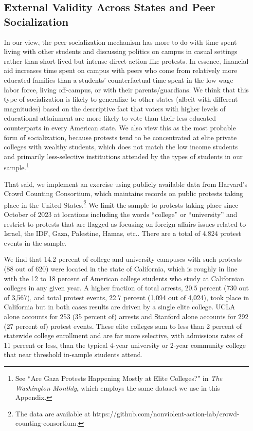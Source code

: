 \documentclass[12pt,letterpaper,oneside]{book}
\begin{document}
\subsection{External Validity Across States and Peer Socialization}\label{sec:externalvalid}
In our view, the peer socialization mechanism has more to do with time spent living with other students and discussing politics on campus in casual settings rather than short-lived but intense direct action like protests. In essence, financial aid increases time spent on campus with peers who come from relatively more educated families than a students' counterfactual time spent in the low-wage labor force, living off-campus, or with their parents/guardians. We think that this type of socialization is likely to generalize to other states (albeit with different magnitudes) based on the descriptive fact that voters with higher levels of educational attainment are more likely to vote than their less educated counterparts in every American state. We also view this as the most probable form of socialization, because protests tend to be concentrated at elite private colleges with wealthy students, which does not match the low income students and primarily less-selective institutions attended by the types of students in our sample.\footnote{See ``Are Gaza Protests Happening Mostly at Elite Colleges?'' in \textit{The Washington Monthly}, which employs the same dataset we use in this Appendix.}

That said, we implement an exercise using publicly available data from Harvard's Crowd Counting Consortium, which maintains records on public protests taking place in the United States.\footnote{The data are available at https://github.com/nonviolent-action-lab/crowd-counting-consortium.} We limit the sample to protests taking place since October of 2023 at locations including the words “college” or “university” and restrict to protests that are flagged as focusing on foreign affairs issues related to Israel, the IDF, Gaza, Palestine, Hamas, etc.. There are a total of 4,824 protest events in the sample.

We find that 14.2 percent of college and university campuses with such protests (88 out of 620) were located in the state of California, which is roughly in line with the 12 to 18 percent of American college students who study at Californian colleges in any given year. A higher fraction of total arrests, 20.5 percent (730 out of 3,567), and total protest events, 22.7 percent (1,094 out of 4,024), took place in California but in both cases results are driven by a single elite college. UCLA alone accounts for 253 (35 percent of) arrests and Stanford alone accounts for 292 (27 percent of) protest events. These elite colleges sum to less than 2 percent of statewide college enrollment and are far more selective, with admissions rates of 11 percent or less, than the typical 4-year university or 2-year community college that near threshold in-sample students attend.
\end{document}
